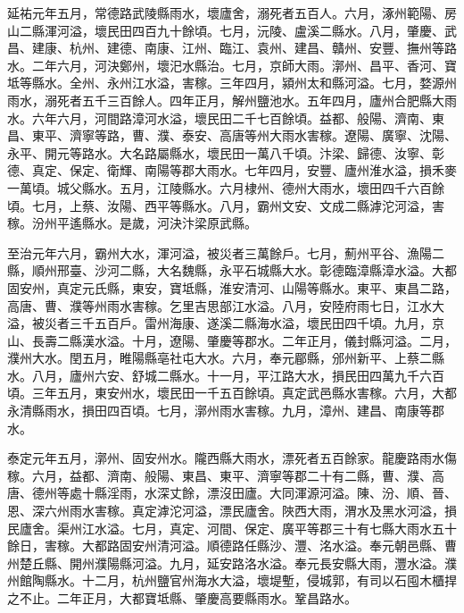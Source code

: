 \begin{pinyinscope}
 延祐元年五月，常德路武陵縣雨水，壞廬舍，溺死者五百人。六月，涿州範陽、房山二縣渾河溢，壞民田四百九十餘頃。七月，沅陵、盧溪二縣水。八月，肇慶、武昌、建康、杭州、建德、南康、江州、臨江、袁州、建昌、贛州、安豐、撫州等路水。二年六月，河決鄭州，壞汜水縣治。七月，京師大雨。漷州、昌平、香河、寶坻等縣水。全州、永州江水溢，害稼。三年四月，潁州太和縣河溢。七月，婺源州雨水，溺死者五千三百餘人。四年正月，解州鹽池水。五年四月，廬州合肥縣大雨水。六年六月，河間路漳河水溢，壞民田二千七百餘頃。益都、般陽、濟南、東昌、東平、濟寧等路，曹、濮、泰安、高唐等州大雨水害稼。遼陽、廣寧、沈陽、永平、開元等路水。大名路屬縣水，壞民田一萬八千頃。汴梁、歸德、汝寧、彰德、真定、保定、衛輝、南陽等郡大雨水。七年四月，安豐、廬州淮水溢，損禾麥一萬頃。城父縣水。五月，江陵縣水。六月棣州、德州大雨水，壞田四千六百餘頃。七月，上蔡、汝陽、西平等縣水。八月，霸州文安、文成二縣滹沱河溢，害稼。汾州平遙縣水。是歲，河決汴梁原武縣。



 至治元年六月，霸州大水，渾河溢，被災者三萬餘戶。七月，薊州平谷、漁陽二縣，順州邢臺、沙河二縣，大名魏縣，永平石城縣大水。彰德臨漳縣漳水溢。大都固安州，真定元氏縣，東安，寶坻縣，淮安清河、山陽等縣水。東平、東昌二路，高唐、曹、濮等州雨水害稼。乞里吉思部江水溢。八月，安陸府雨七日，江水大溢，被災者三千五百戶。雷州海康、遂溪二縣海水溢，壞民田四千頃。九月，京山、長壽二縣漢水溢。十月，遼陽、肇慶等郡水。二年正月，儀封縣河溢。二月，濮州大水。閏五月，睢陽縣亳社屯大水。六月，奉元郿縣，邠州新平、上蔡二縣水。八月，廬州六安、舒城二縣水。十一月，平江路大水，損民田四萬九千六百頃。三年五月，東安州水，壞民田一千五百餘頃。真定武邑縣水害稼。六月，大都永清縣雨水，損田四百頃。七月，漷州雨水害稼。九月，漳州、建昌、南康等郡水。



 泰定元年五月，漷州、固安州水。隴西縣大雨水，漂死者五百餘家。龍慶路雨水傷稼。六月，益都、濟南、般陽、東昌、東平、濟寧等郡二十有二縣，曹、濮、高唐、德州等處十縣淫雨，水深丈餘，漂沒田廬。大同渾源河溢。陳、汾、順、晉、恩、深六州雨水害稼。真定滹沱河溢，漂民廬舍。陜西大雨，渭水及黑水河溢，損民廬舍。渠州江水溢。七月，真定、河間、保定、廣平等郡三十有七縣大雨水五十餘日，害稼。大都路固安州清河溢。順德路任縣沙、灃、洺水溢。奉元朝邑縣、曹州楚丘縣、開州濮陽縣河溢。九月，延安路洛水溢。奉元長安縣大雨，灃水溢。濮州館陶縣水。十二月，杭州鹽官州海水大溢，壞堤塹，侵城郭，有司以石囤木櫃捍之不止。二年正月，大都寶坻縣、肇慶高要縣雨水。鞏昌路水。




\end{pinyinscope}

